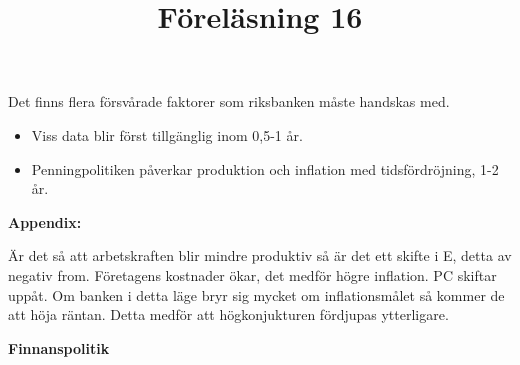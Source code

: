 \documentclass{article}
\begin{document}
\vspace{5mm} \par \noindent 

Det finns flera försvårade faktorer som riksbanken måste handskas med. 
\begin{itemize}
     \item Viss data blir först tillgänglig inom 0,5-1 år. 
     \item Penningpolitiken påverkar produktion och inflation med tidsfördröjning, 1-2 år. 
\end{itemize}

\textbf{Appendix: } \vspace{5mm} \par \noindent Är det så att arbetskraften blir mindre produktiv så är det ett skifte i E, detta av negativ from. Företagens kostnader ökar, det medför högre inflation. PC skiftar uppåt. Om banken i detta läge bryr sig mycket om inflationsmålet så kommer de att höja räntan. Detta medför att högkonjukturen fördjupas ytterligare. 
\vspace{5mm} \par \noindent 
\title{Föreläsning 16}
\vspace{5mm} \par \noindent 

\textbf{Finnanspolitik}

\vspace{5mm} \par \noindent 







\end{document}
